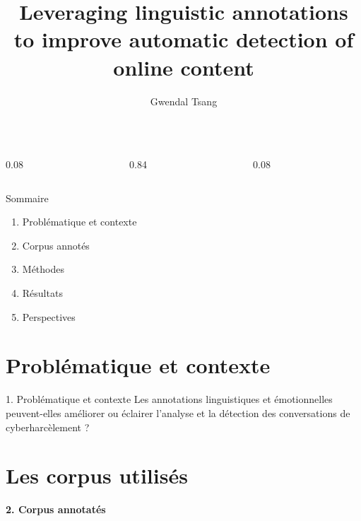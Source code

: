 \documentclass[aspectratio=169,10pt,xcolor=table]{beamer}
\title{Leveraging linguistic annotations to improve automatic detection of online content}
\author{Gwendal Tsang}
\institute{\ Valentina Dragos\\Delphine Battistelli}
\date{}
\begin{document}
\begin{frame}
  \begin{columns}
    \begin{column}{0.08\textwidth}\end{column}
    \begin{column}{0.84\textwidth}
      \titlepage
    \end{column}
    \begin{column}{0.08\textwidth}\end{column}
  \end{columns}
\end{frame}

\begin{frame}{Sommaire}
\large
\begin{center}
  \begin{minipage}{0.42\textwidth}
    \begin{enumerate}
      \item Problématique et contexte
      \item Corpus annotés 
      \item Méthodes
      \item Résultats
      \item Perspectives
    \end{enumerate}
  \end{minipage}
\end{center}
\end{frame}

\section{Problématique et contexte}

\begin{frame}{1. Problématique et contexte}
\centering
\Large
Les annotations linguistiques et émotionnelles peuvent-elles améliorer ou éclairer l'analyse et la détection des conversations de cyberharcèlement ?
\end{frame}

\section{Les corpus utilisés}

\begin{frame}
  \begin{center}
    {\LARGE\bfseries 2. Corpus annotatés}\par
  \end{center}
\end{frame}
\end{document}
